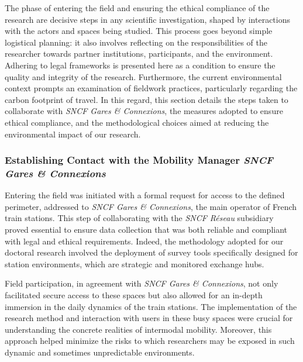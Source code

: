 \begin{refsegment}
The phase of entering the field and ensuring the ethical compliance of the research are decisive steps in any scientific investigation, shaped by interactions with the actors and spaces being studied. This process goes beyond simple logistical planning: it also involves reflecting on the responsibilities of the researcher towards partner institutions, participants, and the environment. Adhering to legal frameworks is presented here as a condition to ensure the quality and integrity of the research. Furthermore, the current environmental context prompts an examination of fieldwork practices, particularly regarding the carbon footprint of travel. In this regard, this section details the steps taken to collaborate with \textsl{SNCF Gares \& Connexions}, the measures adopted to ensure ethical compliance, and the methodological choices aimed at reducing the environmental impact of our research.%

\subsubsection*{Establishing Contact with the Mobility Manager \textsl{SNCF Gares \& Connexions}
    \label{chap3:accord-sncf}
    }

Entering the field was initiated with a formal request for access to the defined perimeter, addressed to \textsl{SNCF Gares \& Connexions}, the main operator of French train stations. This step of collaborating with the \textsl{SNCF Réseau} subsidiary proved essential to ensure data collection that was both reliable and compliant with legal and ethical requirements. Indeed, the methodology adopted for our doctoral research involved the deployment of survey tools specifically designed for station environments, which are strategic and monitored exchange hubs.%

Field participation, in agreement with \textsl{SNCF Gares \& Connexions}, not only facilitated secure access to these spaces but also allowed for an in-depth immersion in the daily dynamics of the train stations. The implementation of the research method and interaction with users in these busy spaces were crucial for understanding the concrete realities of intermodal mobility. Moreover, this approach helped minimize the risks to which researchers may be exposed in such dynamic and sometimes unpredictable environments.%


\end{refsegment}
